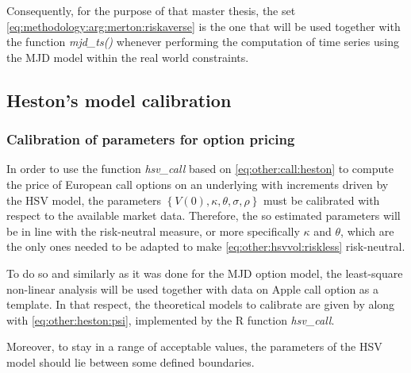 \documentclass[a4paper, 12pt]{report}
\begin{document}
Consequently, for the purpose of that master thesis, the set \ref{eq:methodology:arg:merton:riskaverse} is the one that will be used together with the function \textit{mjd\_ts()} whenever performing the computation of time series using the MJD model within the real world constraints.











%
%
%
%
%
%


\subsection{Heston's model calibration}
\label{sub:methodology:calibration:heston}

\subsubsection*{Calibration of parameters for option pricing}

In order to use the function \textit{hsv\_call} based on \cref{eq:other:call:heston} to compute the price of European call options on an underlying with increments driven by the HSV model, the parameters $\left\{ V(0), \kappa, \theta, \sigma, \rho \right\}$ must be calibrated with respect to the available market data.
Therefore, the so estimated parameters will be in line with the risk-neutral measure, or more specifically $\kappa$ and $\theta$, which are the only ones needed to be adapted to make \cref{eq:other:hsvvol:riskless} risk-neutral.

To do so and similarly as it was done for the MJD option model, the least-square non-linear analysis will be used together with data on Apple call option as a template.
In that respect, the theoretical models to calibrate are given by  along with \cref{eq:other:heston:psi}, implemented by the R function \textit{hsv\_call}.

Moreover, to stay in a range of acceptable values, the parameters of the HSV model should lie between some defined boundaries. 
\end{document}
